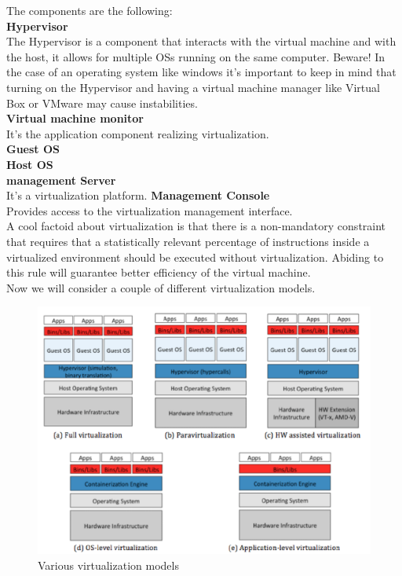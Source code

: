The components are the following: \\
\smallSpace
\textbf{Hypervisor} \\
The Hypervisor is a component that interacts with the virtual machine and with the host, it allows for multiple OSs running on the same computer. Beware! In the case of an operating system like windows it's important to keep in mind that turning on the Hypervisor and having a virtual machine manager like Virtual Box or VMware may cause instabilities. \\
\smallSpace
\textbf{Virtual machine monitor}\\
It's the application component realizing virtualization. \\
\smallSpace
\textbf{Guest OS} \\
\smallSpace
\textbf{Host OS} \\
\smallSpace
\textbf{management Server} \\
It's a virtualization platform.
\smallSpace
\textbf{Management Console} \\
Provides access to the virtualization management interface. \\
\subSpace
A cool factoid about virtualization is that there is a non-mandatory constraint that requires that a statistically relevant percentage of instructions inside a virtualized environment should be executed without virtualization. Abiding to this rule will guarantee better efficiency of the virtual machine. \\
Now we will consider a couple of different virtualization models. 
\begin{figure}
    \centering
    \includegraphics[scale=0.4]{./Images/virtualization_stacks.png}
    \caption{Various virtualization models}
\end{figure}
